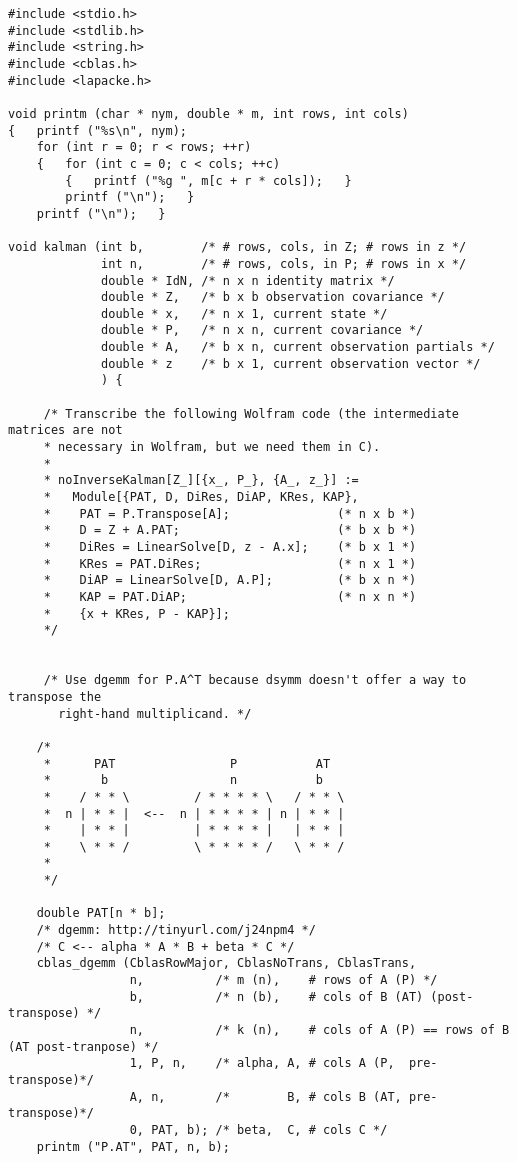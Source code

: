 \documentclass[10pt,oneside,x11names]{article}
\begin{document}
\begin{verbatim}
#include <stdio.h>
#include <stdlib.h>
#include <string.h>
#include <cblas.h>
#include <lapacke.h>

void printm (char * nym, double * m, int rows, int cols)
{   printf ("%s\n", nym);
    for (int r = 0; r < rows; ++r)
    {   for (int c = 0; c < cols; ++c)
        {   printf ("%g ", m[c + r * cols]);   }
        printf ("\n");   }
    printf ("\n");   }

void kalman (int b,        /* # rows, cols, in Z; # rows in z */
             int n,        /* # rows, cols, in P; # rows in x */
             double * IdN, /* n x n identity matrix */
             double * Z,   /* b x b observation covariance */
             double * x,   /* n x 1, current state */
             double * P,   /* n x n, current covariance */
             double * A,   /* b x n, current observation partials */
             double * z    /* b x 1, current observation vector */
             ) {

     /* Transcribe the following Wolfram code (the intermediate matrices are not
     * necessary in Wolfram, but we need them in C).
     *
     * noInverseKalman[Z_][{x_, P_}, {A_, z_}] :=
     *   Module[{PAT, D, DiRes, DiAP, KRes, KAP},
     *    PAT = P.Transpose[A];               (* n x b *)
     *    D = Z + A.PAT;                      (* b x b *)
     *    DiRes = LinearSolve[D, z - A.x];    (* b x 1 *)
     *    KRes = PAT.DiRes;                   (* n x 1 *)
     *    DiAP = LinearSolve[D, A.P];         (* b x n *)
     *    KAP = PAT.DiAP;                     (* n x n *)
     *    {x + KRes, P - KAP}];
     */


     /* Use dgemm for P.A^T because dsymm doesn't offer a way to transpose the
       right-hand multiplicand. */

    /*
     *      PAT                P           AT
     *       b                 n           b
     *    / * * \         / * * * * \   / * * \
     *  n | * * |  <--  n | * * * * | n | * * |
     *    | * * |         | * * * * |   | * * |
     *    \ * * /         \ * * * * /   \ * * /
     *
     */

    double PAT[n * b];
    /* dgemm: http://tinyurl.com/j24npm4 */
    /* C <-- alpha * A * B + beta * C */
    cblas_dgemm (CblasRowMajor, CblasNoTrans, CblasTrans,
                 n,          /* m (n),    # rows of A (P) */
                 b,          /* n (b),    # cols of B (AT) (post-transpose) */
                 n,          /* k (n),    # cols of A (P) == rows of B (AT post-tranpose) */
                 1, P, n,    /* alpha, A, # cols A (P,  pre-transpose)*/
                 A, n,       /*        B, # cols B (AT, pre-transpose)*/
                 0, PAT, b); /* beta,  C, # cols C */
    printm ("P.AT", PAT, n, b);


\end{verbatim}
\end{document}
